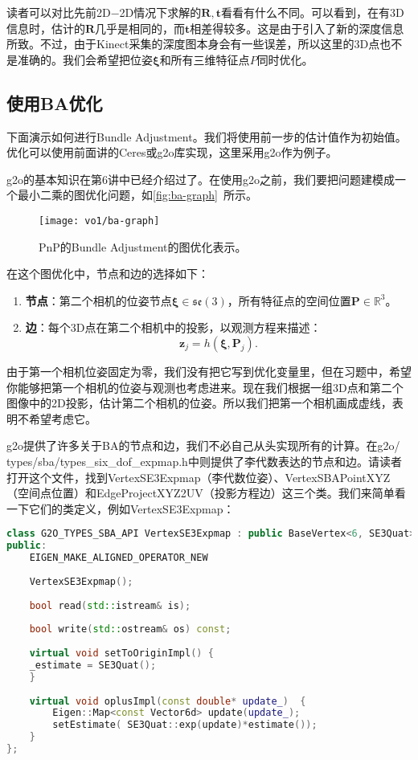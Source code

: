 读者可以对比先前2D−2D情况下求解的$\bm{R},\bm{t}$看看有什么不同。可以看到，在有3D信息时，估计的$\bm{R}$几乎是相同的，而$\bm{t}$相差得较多。这是由于引入了新的深度信息所致。不过，由于Kinect采集的深度图本身会有一些误差，所以这里的3D点也不是准确的。我们会希望把位姿$\bm{\xi}$和所有三维特征点$P$同时优化。

\subsection{使用BA优化}
下面演示如何进行Bundle Adjustment。我们将使用前一步的估计值作为初始值。优化可以使用前面讲的Ceres或g2o库实现，这里采用g2o作为例子。

g2o的基本知识在第6讲中已经介绍过了。在使用g2o之前，我们要把问题建模成一个最小二乘的图优化问题，如\autoref{fig:ba-graph}~所示。

\clearpage
\begin{figure}[!htp]
	\centering
	\texttt{[image: vo1/ba-graph]}
	\caption{PnP的Bundle Adjustment的图优化表示。}
	\label{fig:ba-graph}
\end{figure}

在这个图优化中，节点和边的选择如下：
\begin{enumerate}
	\item \textbf{节点}：第二个相机的位姿节点$\bm{\xi} \in \mathfrak{se}(3)$，所有特征点的空间位置$\bm{P} \in \mathbb{R}^3$。
	\item \textbf{边}：每个3D点在第二个相机中的投影，以观测方程来描述：
	\[
	\bm{z}_j = h( \bm{\xi}, \bm{P}_{j} ).
	\]
\end{enumerate}

由于第一个相机位姿固定为零，我们没有把它写到优化变量里，但在习题中，希望你能够把第一个相机的位姿与观测也考虑进来。现在我们根据一组3D点和第二个图像中的2D投影，估计第二个相机的位姿。所以我们把第一个相机画成虚线，表明不希望考虑它。

g2o提供了许多关于BA的节点和边，我们不必自己从头实现所有的计算。在g2o/\\types/sba/types\_six\_dof\_expmap.h中则提供了李代数表达的节点和边。请读者打开这个文件，找到VertexSE3Expmap（李代数位姿）、VertexSBAPointXYZ（空间点位置）和EdgeProjectXYZ2UV（投影方程边）这三个类。我们来简单看一下它们的类定义，例如VertexSE3Expmap：

\begin{lstlisting}[language=c++]
class G2O_TYPES_SBA_API VertexSE3Expmap : public BaseVertex<6, SE3Quat>{
public:
	EIGEN_MAKE_ALIGNED_OPERATOR_NEW
	
	VertexSE3Expmap();
	
	bool read(std::istream& is);
	
	bool write(std::ostream& os) const;
	
	virtual void setToOriginImpl() {
	_estimate = SE3Quat();
	}
	
	virtual void oplusImpl(const double* update_)  {
		Eigen::Map<const Vector6d> update(update_);
		setEstimate( SE3Quat::exp(update)*estimate());
	}
};
\end{lstlisting}

